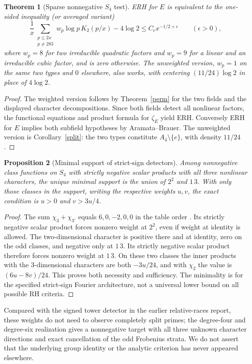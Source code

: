 \documentclass[11pt]{article}
\newtheorem{theorem}{Theorem}[section]
\newtheorem{proposition}[theorem]{Proposition}
\theoremstyle{definition}\newtheorem{definition}[theorem]{Definition}
\begin{document}
\begin{theorem}[Sparse nonnegative $S_4$ test]\label{quartic}
ERH for $E$ is equivalent to the one-sided inequality (or averaged variant)
\[
 \frac1x\sum_{\substack{p\le2x\\p\ne283}}w_p\log p\,K_2(p/x)-4\log2
 \le C_\epsilon x^{-1/2+\epsilon}\qquad(\epsilon>0),
\]
where $w_p=8$ for two irreducible quadratic factors and $w_p=9$ for a linear and an irreducible cubic factor, and is zero otherwise. The unweighted version, $w_p=1$ on the same two types and $0$ elsewhere, also works, with centering $(11/24)\log2$ in place of $4\log2$.
\end{theorem}
\begin{proof}
The weighted version follows by Theorem~\ref{perm} for the two fields and the displayed character decompositions. Since both fields detect all nonlinear factors, the functional equations and product formula for $\zeta_E$ yield ERH. Conversely ERH for $E$ implies both subfield hypotheses by Aramata--Brauer. The unweighted version is Corollary~\ref{split}: the two types constitute $A_4\setminus\{e\}$, with density $11/24$.
\end{proof}

\begin{proposition}[Minimal support of strict-sign detectors]
Among nonnegative class functions on $S_4$ with strictly negative scalar products with all three nonlinear characters, the unique minimal support is the union of $2^2$ and $1\,3$. With only those classes in the support, writing the respective weights $u,v$, the exact condition is $u>0$ and $v>3u/4$.
\end{proposition}
\begin{proof}
The sum $\chi_3+\chi_{3'}$ equals $6,0,-2,0,0$ in the table order . Its strictly negative scalar product forces nonzero weight at $2^2$, even if weight at identity is allowed. The two-dimensional character is positive there and at identity, zero on the odd classes, and negative only at $1\,3$. Its strictly negative scalar product therefore forces nonzero weight at $1\,3$. On these two classes the inner products with the 3-dimensional characters are both $-3u/24$, and with $\chi_2$ the value is $(6u-8v)/24$. This proves both necessity and sufficiency. The minimality is for the specified strict-sign Fourier architecture, not a universal lower bound on all possible RH criteria.
\end{proof}
Compared with the signed tower detector in the earlier relative-races report, these weights do not need to observe completely split primes; the degree-four and degree-six realization gives a nonnegative target with all three unknown character directions and exact cancellation of the odd Frobenius strata. We do not assert that the underlying group identity or the analytic criterion has never appeared elsewhere.
\end{document}
